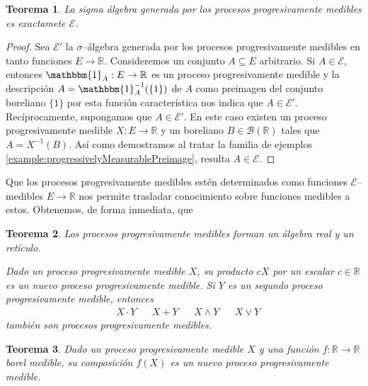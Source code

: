 \documentclass{report}
\newcommand{\characteristic}{\mathbbm{1}}
\newcommand{\borel}{\mathscr{B}}
\newcommand{\progressiveAlgebra}{\mathscr{E}}
\newcommand{\realNumbers}{\mathbb{R}}
\theoremstyle{plain}
\newtheorem{theorem}{Teorema}
\theoremstyle{remark}
\theoremstyle{definition}
\begin{document}
\begin{theorem}
  La sigma álgebra generada por los procesos progresivamente medibles es exactamete \(\progressiveAlgebra\).
\end{theorem}
\begin{proof}
  Sea \(\progressiveAlgebra'\) la \(\sigma\)--álgebra generada por los procesos progresivamente medibles en tanto funciones \(E \rightarrow \realNumbers\).
  Consideremos un conjunto \(A \subseteq E\) arbitrario.
  Si \(A \in \progressiveAlgebra\), entonces \(\characteristic_A : E \rightarrow \realNumbers\) es un proceso progresivamente medible y la descripción \(A = \characteristic_A^{- 1}(\{1\})\) de \(A\) como preimagen del conjunto boreliano \(\{1\}\) por esta función característica nos indica que \(A \in \progressiveAlgebra'\).
  Recíprocamente, supongamos que \(A \in \progressiveAlgebra'\).
  En este caso existen un proceso progresivamente medible \(X : E \rightarrow \realNumbers\) y un boreliano \(B \in \borel(\realNumbers)\) tales que \(A = X^{- 1}(B)\).
  Así como demostramos al tratar la familia de ejemplos \ref{example:progressivelyMeasurablePreimage}, resulta \(A \in \progressiveAlgebra\). 
\end{proof}


Que los procesos progresivamente medibles estén determinados como funciones \(\progressiveAlgebra\)--medibles \(E \rightarrow \realNumbers\) nos permite trasladar conocimiento sobre funciones medibles a estos.
Obtenemos, de forma inmediata, que 

\begin{theorem}
  \label{theorem:algebraOfProgressiveProcesses}
  Los procesos progresivamente medibles forman un álgebra real y un retículo.

  Dado un proceso progresivamente medible \(X\), su producto \(c X\) por un escalar \(c \in \realNumbers\) es un nuevo proceso progresivamente medible.
  Si \(Y\) es un segundo proceso progresivamente medible, entonces
  \begin{align}
    & X \cdot Y
    &&  X + Y
    &&  X \wedge Y
    && X \vee Y
  \end{align}
  también son procesos progresivamente medibles.
\end{theorem}

\begin{theorem}
  Dado un proceso progresivamente medible \(X\) y una función \(f : \realNumbers \rightarrow \realNumbers\) borel medible, su composición \(f(X)\) es un nuevo proceso progresivamente medible.
\end{theorem}
\end{document}
